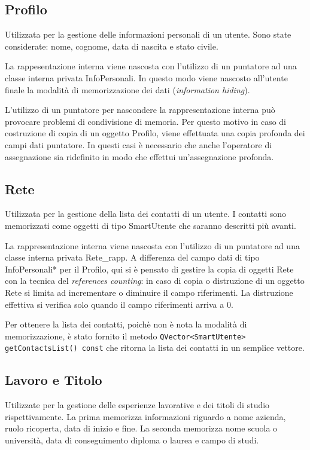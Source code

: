 \documentclass[a4paper]{article}
\begin{document}
\subsection*{Profilo}
Utilizzata per la gestione delle informazioni personali di un utente. Sono state considerate: nome, cognome, data di nascita e stato civile. 

La rappesentazione interna viene nascosta con l'utilizzo di un puntatore ad una classe interna privata InfoPersonali. In questo modo viene nascosto all'utente finale la modalità di memorizzazione dei dati (\textit{information hiding}).

L'utilizzo di un puntatore per nascondere la rappresentazione interna può provocare problemi di condivisione di memoria. Per questo motivo in caso di costruzione di copia di un oggetto Profilo, viene effettuata una copia profonda dei campi dati puntatore. In questi casi è necessario che anche l'operatore di assegnazione sia ridefinito in modo che effettui un'assegnazione profonda.

\subsection*{Rete}
Utilizzata per la gestione della lista dei contatti di un utente. I contatti sono memorizzati come oggetti di tipo SmartUtente che saranno descritti più avanti.

La rappresentazione interna viene nascosta con l'utilizzo di un puntatore ad una classe interna privata Rete\_rapp. A differenza del campo dati di tipo InfoPersonali* per il Profilo, qui si è pensato di gestire la copia di oggetti Rete con la tecnica del \textit{references counting}: in caso di copia o distruzione di un oggetto Rete si limita ad incrementare o diminuire il campo riferimenti. La distruzione effettiva si verifica solo quando il campo riferimenti arriva a 0.

Per ottenere la lista dei contatti, poichè non è nota la modalità di memorizzazione, è stato fornito il metodo \texttt{QVector<SmartUtente> getContactsList() const} che ritorna la lista dei contatti in un semplice vettore.

\subsection*{Lavoro e Titolo}
Utilizzate per la gestione delle esperienze lavorative e dei titoli di studio rispettivamente. La prima memorizza informazioni riguardo a nome azienda, ruolo ricoperta, data di inizio e fine. La seconda memorizza nome scuola o università, data di conseguimento diploma o laurea e campo di studi.
\end{document}
